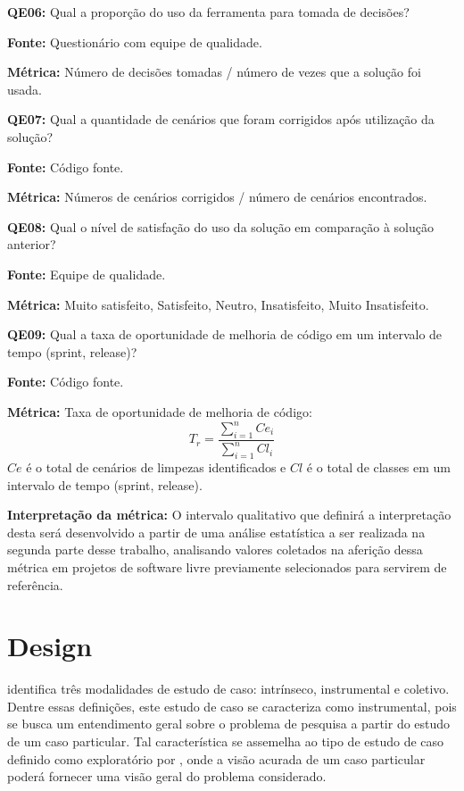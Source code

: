 
\textbf{QE06: } Qual a proporção do uso da ferramenta para tomada de decisões?

\textbf{Fonte:} Questionário com equipe de qualidade.

\textbf{Métrica:} Número de decisões tomadas / número de vezes que a solução foi usada. \newline



\textbf{QE07: } Qual a quantidade de cenários que foram corrigidos após utilização da solução?

\textbf{Fonte:} Código fonte.

\textbf{Métrica:} Números de cenários corrigidos / número de cenários encontrados. \newline


\textbf{QE08: } Qual o nível de satisfação do uso da solução em comparação à solução anterior? 

\textbf{Fonte:} Equipe de qualidade.

\textbf{Métrica:} Muito satisfeito, Satisfeito, Neutro, Insatisfeito, Muito Insatisfeito. \newline


\textbf{QE09: } Qual a taxa de oportunidade de melhoria de código em um intervalo de tempo (sprint, release)? 

\textbf{Fonte:} Código fonte.

\textbf{Métrica:} Taxa de oportunidade de melhoria de código: $$ T_r =   \frac{{\sum_{i=1}^{n}{Ce_i}}}{\sum_{i=1}^{n}{Cl_i}} $$ $ Ce $ é o total de cenários de limpezas identificados e $ Cl $  é o total de classes em um intervalo de tempo (sprint, release).

\textbf{Interpretação da métrica:} O intervalo qualitativo que definirá a interpretação desta será desenvolvido a partir de uma análise estatística a ser realizada na segunda parte desse trabalho, analisando valores coletados na aferição dessa métrica em projetos de software livre previamente selecionados para servirem de referência. 

\section{Design} \label{sec:Design}

 identifica três modalidades de estudo de caso: intrínseco, instrumental e coletivo. Dentre essas definições, este estudo de caso se caracteriza como instrumental, pois se busca um entendimento geral sobre o problema de pesquisa a partir do estudo de um caso particular. Tal característica se assemelha ao tipo de estudo de caso definido como exploratório por , onde a visão acurada de um caso particular poderá fornecer uma visão geral do problema considerado.

